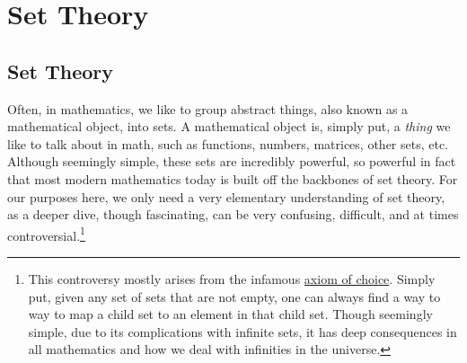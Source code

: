 \edef\mychapter{Set Theory}
\edef\mychapterdate{June 18, 2024}

\chapter{\mychapter}
\section{Set Theory}
Often, in mathematics, we like to group abstract things, also known as a mathematical object, into sets. A mathematical object is, simply put, a \textit{thing} we like to talk about in math, such as functions, numbers, matrices, other sets, etc.
Although seemingly simple, these sets are incredibly powerful, so powerful in fact that most modern mathematics today is built off the backbones of set theory. 
For our purposes here, we only need a very elementary understanding of set theory, as a deeper dive, though fascinating, can be very confusing, difficult, and at times controversial.\footnote{This controversy mostly arises from the infamous \href{https://en.wikipedia.org/wiki/Axiom_of_choice}{axiom of choice}. 
Simply put, given any set of sets that are not empty, one can always find a way to way to map a child set to an element in that child set. Though seemingly simple, due to its complications with infinite sets, it has deep consequences in all mathematics and how we deal with infinities in the universe.}
